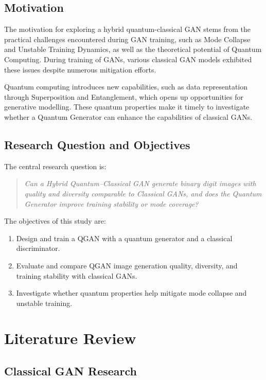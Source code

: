 \documentclass[conference]{IEEEtran}
\begin{document}
\subsection{Motivation}

The motivation for exploring a hybrid quantum-classical GAN stems from the practical challenges encountered during GAN training, such as Mode Collapse and Unstable Training Dynamics, as well as the theoretical potential of Quantum Computing. During training of GANs, various classical GAN models exhibited these issues despite numerous mitigation efforts.

Quantum computing introduces new capabilities, such as data representation through Superposition and Entanglement, which opens up opportunities for generative modelling. These quantum properties make it timely to investigate whether a Quantum Generator can enhance the capabilities of classical GANs.

\subsection{Research Question and Objectives}
The central research question is:
\begin{quote}
\emph{Can a Hybrid Quantum–Classical GAN generate binary digit images with quality and diversity comparable to Classical GANs, and does the Quantum Generator improve training stability or mode coverage?}
\end{quote}

The objectives of this study are:
\begin{enumerate}
    \item Design and train a QGAN with a quantum generator and a classical discriminator.
    \item Evaluate and compare QGAN image generation quality, diversity, and training stability with classical GANs.
    \item Investigate whether quantum properties help mitigate mode collapse and unstable training.
\end{enumerate}

\section{Literature Review}\label{review}

\subsection{Classical GAN Research}
\end{document}
